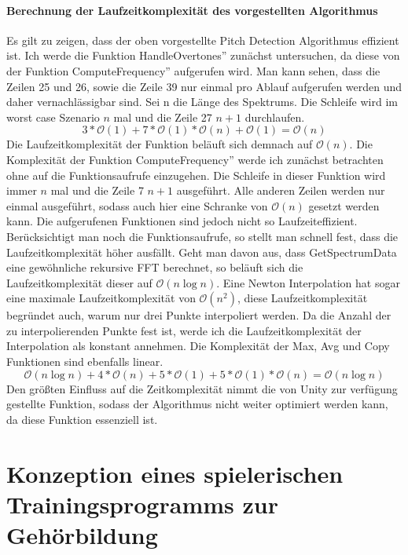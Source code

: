 \subsubsection*{Berechnung der Laufzeitkomplexität des vorgestellten Algorithmus}
Es gilt zu zeigen, dass der oben vorgestellte Pitch Detection Algorithmus effizient ist. Ich werde die Funktion \glqq HandleOvertones'' zunächst untersuchen, da diese von der Funktion \glqq ComputeFrequency'' aufgerufen wird. Man kann sehen, dass die Zeilen 25 und 26, sowie die Zeile 39 nur einmal pro Ablauf aufgerufen werden und daher vernachlässigbar sind. Sei n die Länge des Spektrums. Die Schleife wird im worst case Szenario $n$ mal und die Zeile 27 $n + 1$ durchlaufen. 
$$3 * \mathcal{O}(1) + 7 * \mathcal{O}(1) * \mathcal{O}(n) + \mathcal{O}(1) = \mathcal{O}(n) $$
Die Laufzeitkomplexität der Funktion beläuft sich demnach auf $\mathcal{O}(n)$. Die Komplexität der Funktion \glqq ComputeFrequency'' werde ich zunächst betrachten ohne auf die Funktionsaufrufe einzugehen. Die Schleife in dieser Funktion wird immer $n$ mal und die Zeile 7 $n + 1$ ausgeführt. Alle anderen Zeilen werden nur einmal ausgeführt, sodass auch hier eine Schranke von $\mathcal{O}(n)$ gesetzt werden kann. Die aufgerufenen Funktionen sind jedoch nicht so Laufzeiteffizient. Berücksichtigt man noch die Funktionsaufrufe, so stellt man schnell fest, dass die Laufzeitkomplexität höher ausfällt. Geht man davon aus, dass GetSpectrumData eine gewöhnliche rekursive FFT berechnet, so beläuft sich die Laufzeitkomplexität dieser auf $\mathcal{O}(n \log{n})$. Eine Newton Interpolation hat sogar eine maximale Laufzeitkomplexität von $\mathcal{O}(n^2)$, diese Laufzeitkomplexität begründet auch, warum nur drei Punkte interpoliert werden. Da die Anzahl der zu interpolierenden Punkte fest ist, werde ich die Laufzeitkomplexität der Interpolation als konstant annehmen. Die Komplexität der Max, Avg und Copy Funktionen sind ebenfalls linear.
$$\mathcal{O}(n \log{n}) + 4 * \mathcal{O}(n) + 5 * \mathcal{O}(1) + 5 * \mathcal{O}(1) * \mathcal{O}(n) = \mathcal{O}(n \log{n})$$
Den größten Einfluss auf die Zeitkomplexität nimmt die von Unity zur verfügung gestellte Funktion, sodass der Algorithmus nicht weiter optimiert werden kann, da diese Funktion essenziell ist.

\chapter{Konzeption eines spielerischen Trainingsprogramms zur Gehörbildung}

